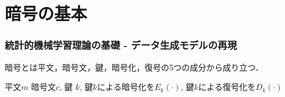 \part{暗号の基本}

\section{統計的機械学習理論の基礎 - データ生成モデルの再現}
暗号とは平文，暗号文，鍵，暗号化，復号の5つの成分から成り立つ．

平文$m$ 暗号文$c$, 鍵 $k$, 鍵$k$による暗号化を$E_k(\cdot)$, 鍵$k$による復号化を$D_k(\cdot)$